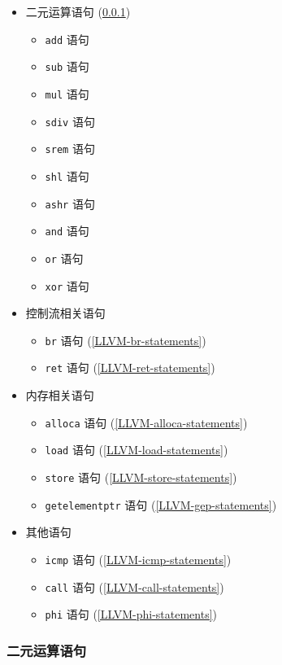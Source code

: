 \begin{itemize}
  \item 二元运算语句 (\ref{LLVM-binary-statements})
    \begin{itemize}
      \item \texttt{add} 语句
      \item \texttt{sub} 语句
      \item \texttt{mul} 语句
      \item \texttt{sdiv} 语句
      \item \texttt{srem} 语句
      \item \texttt{shl} 语句
      \item \texttt{ashr} 语句
      \item \texttt{and} 语句
      \item \texttt{or} 语句
      \item \texttt{xor} 语句
    \end{itemize}
  \item 控制流相关语句
    \begin{itemize}
      \item \texttt{br} 语句 (\ref{LLVM-br-statements})
      \item \texttt{ret} 语句 (\ref{LLVM-ret-statements})
    \end{itemize}
  \item 内存相关语句
    \begin{itemize}
      \item \texttt{alloca} 语句 (\ref{LLVM-alloca-statements})
      \item \texttt{load} 语句 (\ref{LLVM-load-statements})
      \item \texttt{store} 语句 (\ref{LLVM-store-statements})
      \item \texttt{getelementptr} 语句 (\ref{LLVM-gep-statements})
    \end{itemize}
  \item 其他语句
    \begin{itemize}
      \item \texttt{icmp} 语句 (\ref{LLVM-icmp-statements})
      \item \texttt{call} 语句 (\ref{LLVM-call-statements})
      \item \texttt{phi} 语句 (\ref{LLVM-phi-statements})
    \end{itemize}
\end{itemize}

\subsubsection{二元运算语句}\label{LLVM-binary-statements}

